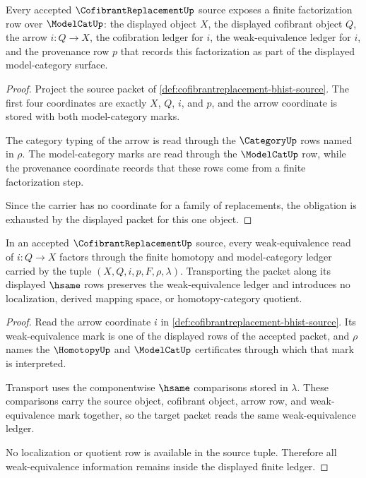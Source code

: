 \begin{theorem}
\label{thm:cofibrantreplacement-factorization-obligation}
Every accepted $\CofibrantReplacementUp$ source exposes a finite factorization row over $\ModelCatUp$: the displayed object $X$, the displayed cofibrant object $Q$, the arrow $i:Q\to X$, the cofibration ledger for $i$, the weak-equivalence ledger for $i$, and the provenance row $p$ that records this factorization as part of the displayed model-category surface.
\end{theorem}
\begin{proof}
Project the source packet of \autoref{def:cofibrantreplacement-bhist-source}. The first four coordinates are exactly $X$, $Q$, $i$, and $p$, and the arrow coordinate is stored with both model-category marks.

The category typing of the arrow is read through the $\CategoryUp$ rows named in $\rho$. The model-category marks are read through the $\ModelCatUp$ row, while the provenance coordinate records that these rows come from a finite factorization step.

Since the carrier has no coordinate for a family of replacements, the obligation is exhausted by the displayed packet for this one object.
\end{proof}

\begin{theorem}
\label{thm:cofibrantreplacement-weak-equivalence-ledger}
In an accepted $\CofibrantReplacementUp$ source, every weak-equivalence read of $i:Q\to X$ factors through the finite homotopy and model-category ledger carried by the tuple $(X,Q,i,p,F,\rho,\lambda)$. Transporting the packet along its displayed $\hsame$ rows preserves the weak-equivalence ledger and introduces no localization, derived mapping space, or homotopy-category quotient.
\end{theorem}
\begin{proof}
Read the arrow coordinate $i$ in \autoref{def:cofibrantreplacement-bhist-source}. Its weak-equivalence mark is one of the displayed rows of the accepted packet, and $\rho$ names the $\HomotopyUp$ and $\ModelCatUp$ certificates through which that mark is interpreted.

Transport uses the componentwise $\hsame$ comparisons stored in $\lambda$. These comparisons carry the source object, cofibrant object, arrow row, and weak-equivalence mark together, so the target packet reads the same weak-equivalence ledger.

No localization or quotient row is available in the source tuple. Therefore all weak-equivalence information remains inside the displayed finite ledger.
\end{proof}

